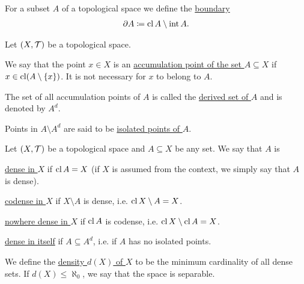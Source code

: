 \begin{definition}\label{def:topological_boundary}\cite[24]{Engelking1989}
  For a subset $A$ of a topological space we define the \ul{boundary}
  \begin{align*}
    \partial A \coloneqq \operatorname{cl}{A} \setminus \operatorname{int}{A}.
  \end{align*}
\end{definition}

\begin{definition}\label{def:topologically_derived_set}\cite[24]{Engelking1989}
  Let $(X, \mathcal T)$ be a topological space.

  \begin{defenum}
    \item\label{def:topologically_derived_set/accumulation_point} We say that the point $x \in X$ is an \ul{accumulation point of the set $A \subseteq X$} if $x \in \operatorname{cl}(A \setminus \{ x \})$. It is not necessary for $x$ to belong to $A$.

    \item\label{def:topologically_derived_set/derived_set} The set of all accumulation points of $A$ is called the \ul{derived set of $A$} and is denoted by $A^d$.

    \item\label{def:topologically_derived_set/isolated_point} Points in $A \setminus A^d$ are said to be \ul{isolated points of $A$}.
  \end{defenum}
\end{definition}

\begin{definition}\label{def:topologically_dense_set}\cite[25]{Engelking1989}
  Let $(X, \mathcal T)$ be a topological space and $A \subseteq X$ be any set. We say that $A$ is

  \begin{defenum}
    \item\label{def:topologically_dense_set/dense} \ul{dense in $X$} if $\operatorname{cl}{A} = X$ (if $X$ is assumed from the context, we simply say that $A$ is dense).

    \item\label{def:topologically_dense_set/codense} \ul{codense in $X$} if $X \setminus A$ is dense, i.e. $\operatorname{cl}{X \setminus A} = X$.

    \item\label{def:topologically_dense_set/nowhere_dense} \ul{nowhere dense in $X$} if $\operatorname{cl}{A}$ is codense, i.e. $\operatorname{cl}{X \setminus \operatorname{cl}{A}} = X$.

    \item\label{def:topologically_dense_set/dense_in_itself} \ul{dense in itself} if $A \subseteq A^d$, i.e. if $A$ has no isolated points.
  \end{defenum}

  We define the \ul{density $d(X)$ of $X$} to be the minimum cardinality of all dense sets. If $d(X) \leq \aleph_0$, we say that the space is separable.
\end{definition}
